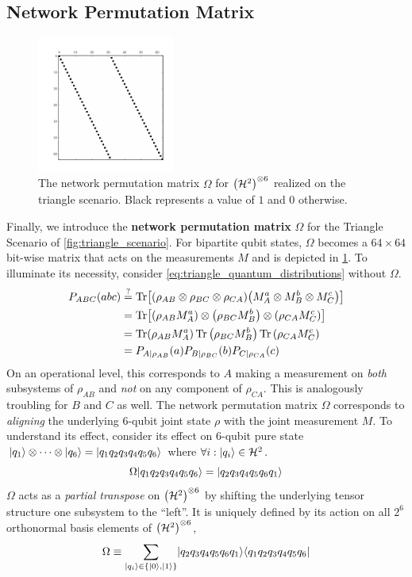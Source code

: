 \documentclass[aps, 10pt, english, twoside, pra, nofootinbib, longbibliography]{revtex4-1}
\theoremstyle{plain}
\theoremstyle{definition}
\theoremstyle{remark}
\newcommand{\Hilb}{\mathcal{H}}
\newcommand{\term}[1]{\textcolor{Mahogany}{\textbf{#1}}}
\begin{document}
    \subsection{Network Permutation Matrix}
    \begin{figure}
        \centering
        \includegraphics[trim={1cm 1.2cm 1.0cm 1cm},clip,width=0.4\textwidth]{../figures/perm_mtrx.pdf}
        \caption{The network permutation matrix $\Omega$ for $\br{\Hilb^2}^{\otimes 6}$ realized on the triangle scenario. Black represents a value of $1$ and $0$ otherwise.}
        \label{fig:perm_mtrx}
    \end{figure}
    Finally, we introduce the \term{network permutation matrix} $\Omega$ for the Triangle Scenario of \cref{fig:triangle_scenario}. For bipartite qubit states, $\Omega$ becomes a $64\times64$ bit-wise matrix that acts on the measurements $M$ and is depicted in \cref{fig:perm_mtrx}. To illuminate its necessity, consider \cref{eq:triangle_quantum_distributions} without $\Omega$.
    \begin{align*}
    \prob[ABC]\br{abc} &\stackrel{?}{=} \Tr\bs{\br{\rho_{AB}\otimes\rho_{BC}\otimes\rho_{CA}} \br{M^a_{A}\otimes M^b_{B} \otimes M^c_{C}}}\\
    &= \Tr\bs{\br{\rho_{AB}M^a_{A}}\otimes\br{\rho_{BC}M^b_{B}}\otimes\br{\rho_{CA}M^c_{C}}}\\
    &= \Tr\br{\rho_{AB}M^a_{A}}\Tr{\br{\rho_{BC}M^b_{B}}}\Tr{\br{\rho_{CA}M^c_{C}}}\\
    &= \prob[A\mid \rho_{AB}]\br{a}\prob[B\mid \rho_{BC}]\br{b}\prob[C\mid \rho_{CA}]\br{c}
    \end{align*}
    On an operational level, this corresponds to $A$ making a measurement on \textit{both} subsystems of $\rho_{AB}$ and \textit{not} on any component of $\rho_{CA}$. This is analogously troubling for $B$ and $C$ as well. The network permutation matrix $\Omega$ corresponds to \textit{aligning} the underlying $6$-qubit joint state $\rho$ with the joint measurement $M$. To understand its effect, consider its effect on $6$-qubit pure state $\ket{q_1} \otimes \cdots \otimes \ket{q_6} = \ket{q_1q_2q_3q_4q_5q_6}$ where $\forall i : \ket{q_i} \in \Hilb^2$.
    \[ \Omega\ket{q_1q_2q_3q_4q_5q_6} = \ket{q_2q_3q_4q_5q_6q_1} \]
    $\Omega$ acts as a \textit{partial transpose} on $\br{\Hilb^2}^{\otimes 6}$ by shifting the underlying tensor structure one subsystem to the ``left''. It is uniquely defined by its action on all $2^6$ orthonormal basis elements of $\br{\Hilb^2}^{\otimes 6}$,
    \[ \Omega \defined \sum_{\ket{q_i} \in \bc{\ket{0}, \ket{1}}}\ket{q_2q_3q_4q_5q_6q_1}\bra{q_1q_2q_3q_4q_5q_6} \]
\end{document}
